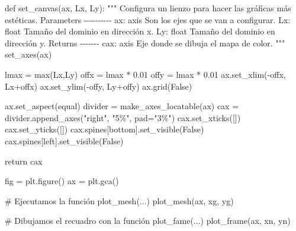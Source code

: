 \documentclass[
  letterpaper,
  DIV=11,
  numbers=noendperiod]{scrreprt}
\newenvironment{Shaded}{\begin{snugshade}}{\end{snugshade}}
\newcommand{\BuiltInTok}[1]{\textcolor[rgb]{0.00,0.23,0.31}{#1}}
\newcommand{\CommentTok}[1]{\textcolor[rgb]{0.37,0.37,0.37}{#1}}
\newcommand{\ControlFlowTok}[1]{\textcolor[rgb]{0.00,0.23,0.31}{#1}}
\newcommand{\FloatTok}[1]{\textcolor[rgb]{0.68,0.00,0.00}{#1}}
\newcommand{\KeywordTok}[1]{\textcolor[rgb]{0.00,0.23,0.31}{#1}}
\newcommand{\NormalTok}[1]{\textcolor[rgb]{0.00,0.23,0.31}{#1}}
\newcommand{\OperatorTok}[1]{\textcolor[rgb]{0.37,0.37,0.37}{#1}}
\newcommand{\StringTok}[1]{\textcolor[rgb]{0.13,0.47,0.30}{#1}}
\newcommand{\VariableTok}[1]{\textcolor[rgb]{0.07,0.07,0.07}{#1}}
\begin{document}
\begin{Shaded}
\begin{Highlighting}[]
\KeywordTok{def}\NormalTok{ set\_canvas(ax, Lx, Ly):}
    \CommentTok{"""}
\CommentTok{    Configura un lienzo para hacer las gráficas más estéticas.}
\CommentTok{    }
\CommentTok{    Parameters}
\CommentTok{    {-}{-}{-}{-}{-}{-}{-}{-}{-}{-}}
\CommentTok{    ax: axis}
\CommentTok{    Son los ejes que se van a configurar.}
\CommentTok{    }
\CommentTok{    Lx: float}
\CommentTok{    Tamaño del dominio en dirección x.}
\CommentTok{    }
\CommentTok{    Ly: float}
\CommentTok{    Tamaño del dominio en dirección y.}
\CommentTok{    }
\CommentTok{    Returns}
\CommentTok{    {-}{-}{-}{-}{-}{-}{-}}
\CommentTok{    cax: axis}
\CommentTok{    Eje donde se dibuja el mapa de color.}
\CommentTok{    """}
\NormalTok{    set\_axes(ax)}

\NormalTok{    lmax }\OperatorTok{=} \BuiltInTok{max}\NormalTok{(Lx,Ly)}
\NormalTok{    offx }\OperatorTok{=}\NormalTok{ lmax }\OperatorTok{*} \FloatTok{0.01}
\NormalTok{    offy }\OperatorTok{=}\NormalTok{ lmax }\OperatorTok{*} \FloatTok{0.01}
\NormalTok{    ax.set\_xlim(}\OperatorTok{{-}}\NormalTok{offx, Lx}\OperatorTok{+}\NormalTok{offx)}
\NormalTok{    ax.set\_ylim(}\OperatorTok{{-}}\NormalTok{offy, Ly}\OperatorTok{+}\NormalTok{offy)}
\NormalTok{    ax.grid(}\VariableTok{False}\NormalTok{)}
    
\NormalTok{    ax.set\_aspect(}\StringTok{\textquotesingle{}equal\textquotesingle{}}\NormalTok{)}
\NormalTok{    divider }\OperatorTok{=}\NormalTok{ make\_axes\_locatable(ax)}
\NormalTok{    cax }\OperatorTok{=}\NormalTok{ divider.append\_axes(}\StringTok{"right"}\NormalTok{, }\StringTok{"5\%"}\NormalTok{, pad}\OperatorTok{=}\StringTok{"3\%"}\NormalTok{)}
\NormalTok{    cax.set\_xticks([])}
\NormalTok{    cax.set\_yticks([])}
\NormalTok{    cax.spines[}\StringTok{\textquotesingle{}bottom\textquotesingle{}}\NormalTok{].set\_visible(}\VariableTok{False}\NormalTok{)}
\NormalTok{    cax.spines[}\StringTok{\textquotesingle{}left\textquotesingle{}}\NormalTok{].set\_visible(}\VariableTok{False}\NormalTok{)}
    
    \ControlFlowTok{return}\NormalTok{ cax}
\end{Highlighting}
\end{Shaded}

\begin{Shaded}
\begin{Highlighting}[]
\NormalTok{fig }\OperatorTok{=}\NormalTok{ plt.figure()}
\NormalTok{ax }\OperatorTok{=}\NormalTok{ plt.gca()}

\CommentTok{\# Ejecutamos la función plot\_mesh(...)}
\NormalTok{plot\_mesh(ax, xg, yg)}

\CommentTok{\# Dibujamos el recuadro con la función plot\_fame(...)}
\NormalTok{plot\_frame(ax, xn, yn)}
\end{Highlighting}
\end{Shaded}
\end{document}
